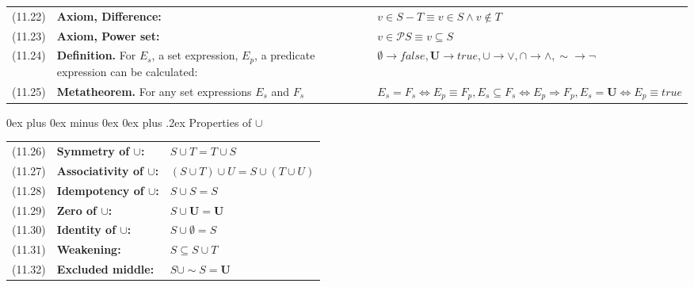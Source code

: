 \documentclass[letterpaper, 8pt]{extarticle}
\makeatletter
\renewcommand{\subsection}{\@startsection{subsection}{2}{0mm}%
                                {0ex plus 0ex minus 0ex}%
                                {0ex plus .2ex}%
                                {\normalfont\small\bfseries}}
\newcommand{\To}{\Rightarrow}
\makeatother
\begin{document}
\begin{multicols*}{3}
\begin{tabulary}{\linewidth}{@{}lLL@{}}
        (11.22) & \textbf{Axiom, Difference:} & $v \in S - T \equiv v \in S \land v \not\in T$ \\
        (11.23) & \textbf{Axiom, Power set:} & $v \in \mathcal{P} S \equiv v \subseteq S$ \\
        (11.24) & \textbf{Definition.} For $E_s$, a set expression, $E_p$, a predicate expression can be calculated: & $\emptyset \to false, \mathbf{U} \to true, \cup \to \lor, \cap \to \land, \sim \to \neg$ \\
        (11.25) & \textbf{Metatheorem.} For any set expressions $E_s$ and $F_s$ & $E_s = F_s \Leftrightarrow E_p \equiv F_p, E_s \subseteq F_s \Leftrightarrow E_p \To F_p, E_s = \mathbf{U} \Leftrightarrow E_p \equiv true$ \\
    \end{tabulary}
    \subsection{Properties of $\cup$}
    \begin{tabulary}{\linewidth}{@{}lLL@{}}
        (11.26) & \textbf{Symmetry of $\cup$:} & $S \cup T = T \cup S$ \\
        (11.27) & \textbf{Associativity of $\cup$:} & $(S \cup T) \cup U = S \cup (T \cup U)$ \\
        (11.28) & \textbf{Idempotency of $\cup$:} & $S \cup S = S$ \\
        (11.29) & \textbf{Zero of $\cup$:} & $S \cup \mathbf{U} = \mathbf{U}$ \\
        (11.30) & \textbf{Identity of $\cup$:} & $S \cup \emptyset = S$ \\
        (11.31) & \textbf{Weakening:} & $S \subseteq S \cup T$ \\
        (11.32) & \textbf{Excluded middle:} & $S \cup \sim S = \mathbf{U}$ \\
    \end{tabulary}

\end{multicols*}
\end{document}
